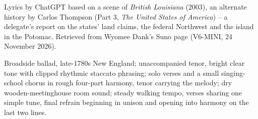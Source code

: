
\begin{notes}
Lyrics by ChatGPT based on a scene of \emph{British Louisiana} (2003), an alternate history by Carlos Thompson (Part 3, \emph{The United States of America}) -- a delegate's report on the states' land claims, the federal Northwest and the island in the Potomac. Retrieved from Wyomee Dank's Suno page (V6-MINI, 24 November 2026).
\end{notes}
\begin{style}
Broadside ballad, late-1780s New England; unaccompanied tenor, bright clear tone with clipped rhythmic staccato phrasing; solo verses and a small singing-school chorus in rough four-part harmony, tenor carrying the melody; dry wooden-meetinghouse room sound; steady walking tempo, verses sharing one simple tune, final refrain beginning in unison and opening into harmony on the last two lines.
\end{style}

